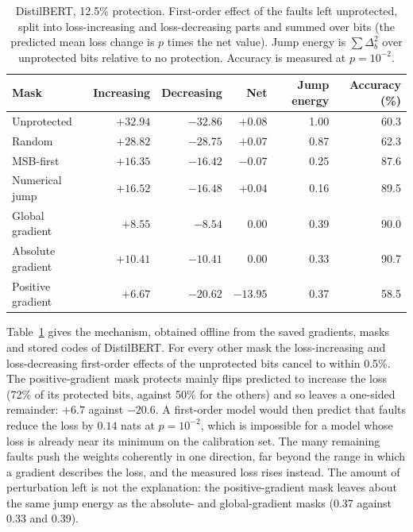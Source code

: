 \begin{table}[t]
\caption{DistilBERT, 12.5\% protection. First-order effect of the faults left unprotected, split into loss-increasing and loss-decreasing parts and summed over bits (the predicted mean loss change is $p$ times the net value). Jump energy is $\sum\Delta_b^2$ over unprotected bits relative to no protection. Accuracy is measured at $p=10^{-2}$.}\label{tab:drift}
\centering\small
\begin{tabular}{l r r r r r}\toprule
Mask & Increasing & Decreasing & Net & Jump energy & Accuracy (\%)\\\midrule
Unprotected & $+32.94$ & $-32.86$ & $+0.08$ & 1.00 & 60.3\\
Random & $+28.82$ & $-28.75$ & $+0.07$ & 0.87 & 62.3\\
MSB-first & $+16.35$ & $-16.42$ & $-0.07$ & 0.25 & 87.6\\
Numerical jump & $+16.52$ & $-16.48$ & $+0.04$ & 0.16 & 89.5\\
Global gradient & $+8.55$ & $-8.54$ & $0.00$ & 0.39 & 90.0\\
Absolute gradient & $+10.41$ & $-10.41$ & $0.00$ & 0.33 & 90.7\\
Positive gradient & $+6.67$ & $-20.62$ & $-13.95$ & 0.37 & 58.5\\\bottomrule
\end{tabular}
\end{table}

Table~\ref{tab:drift} gives the mechanism, obtained offline from the saved gradients, masks and stored codes of DistilBERT. For every other mask the loss-increasing and loss-decreasing first-order effects of the unprotected bits cancel to within 0.5\%. The positive-gradient mask protects mainly flips predicted to increase the loss (72\% of its protected bits, against 50\% for the others) and so leaves a one-sided remainder: $+6.7$ against $-20.6$. A first-order model would then predict that faults reduce the loss by $0.14$ nats at $p=10^{-2}$, which is impossible for a model whose loss is already near its minimum on the calibration set. The many remaining faults push the weights coherently in one direction, far beyond the range in which a gradient describes the loss, and the measured loss rises instead. The amount of perturbation left is not the explanation: the positive-gradient mask leaves about the same jump energy as the absolute- and global-gradient masks (0.37 against 0.33 and 0.39).

